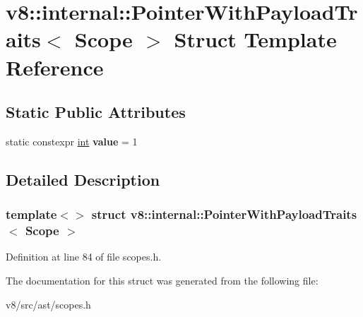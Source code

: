 \hypertarget{structv8_1_1internal_1_1PointerWithPayloadTraits_3_01Scope_01_4}{}\section{v8\+:\+:internal\+:\+:Pointer\+With\+Payload\+Traits$<$ Scope $>$ Struct Template Reference}
\label{structv8_1_1internal_1_1PointerWithPayloadTraits_3_01Scope_01_4}
\subsection*{Static Public Attributes}
\begin{DoxyCompactItemize}
\item 
\mbox{\label{structv8_1_1internal_1_1PointerWithPayloadTraits_3_01Scope_01_4_ab482d57d2094599242cc00c94087b9ae}} 
static constexpr \mbox{\hyperlink{classint}{int}} {\bfseries value} = 1
\end{DoxyCompactItemize}


\subsection{Detailed Description}
\subsubsection*{template$<$$>$\newline
struct v8\+::internal\+::\+Pointer\+With\+Payload\+Traits$<$ Scope $>$}



Definition at line 84 of file scopes.\+h.



The documentation for this struct was generated from the following file\+:\begin{DoxyCompactItemize}
\item 
v8/src/ast/scopes.\+h\end{DoxyCompactItemize}
